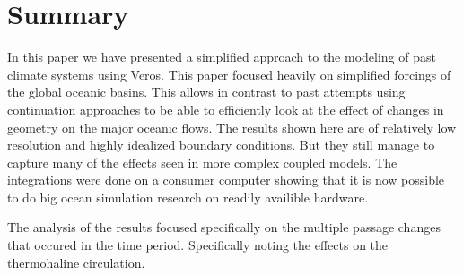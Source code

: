 \section{Summary}
In this paper we have presented a simplified approach to the modeling of past climate systems using Veros. This paper focused heavily on simplified forcings of the global oceanic basins. This allows in contrast to past attempts using continuation approaches to be able to efficiently look at the effect of changes in geometry on the major oceanic flows. The results shown here are of relatively low resolution and highly idealized boundary conditions. But they still manage to capture many of the effects seen in more complex coupled models. The integrations were done on a consumer computer showing that it is now possible to do big ocean simulation research on readily availible hardware.

The analysis of the results focused specifically on the multiple passage changes that occured in the time period. Specifically noting the effects on the thermohaline circulation.

